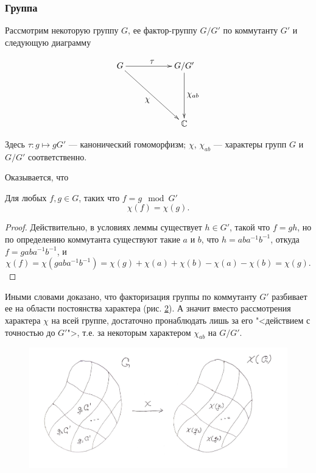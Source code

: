 \subsubsection{Группа}
    Рассмотрим некоторую группу $G$, ее фактор-группу $G/G'$ по коммутанту 
    $G'$ и следующую диаграмму

    \begin{figure}[h]
        \centering
        \[\xymatrix{
            G \ar[rr]^{\textstyle{\tau}} \ar[rrdd]_{\textstyle{\chi}} & & G/G'\ar[dd]^{\textstyle{\chi_{ab}}} \\
            & & \\
            & & \mathbb{C}
        }\]
        \caption{}
        \label{cd_ab}
    \end{figure}

    Здесь $\tau: g \mapsto gG'$ --- канонический гомоморфизм; $\chi$, 
    $\chi_{ab}$ --- характеры групп $G$ и $G/G'$ соответственно.

    Оказывается, что 

    \begin{lemma}\label{lm_const} Для любых $f, g \in G$, таких что $f = g \mod G'$ 
        \[\chi(f) = \chi(g).\]
    \end{lemma}

    \begin{proof} Действительно, в условиях леммы существует $h \in G'$, 
        такой что $f = gh$, но по определению коммутанта существуют такие 
        $a$ и $b$, что $h = aba^{-1}b^{-1}$, откуда $f = gaba^{-1}b^{-1}$, и 
        \[\chi(f) = \chi(gaba^{-1}b^{-1}) 
        = \chi(g) + \chi(a) + \chi(b) - \chi(a) - \chi(b) = \chi(g).\]
    \end{proof}

    Иными словами доказано, что факторизация 
    группы по коммутанту $G'$ разбивает ее на области постоянства
    характера (рис. \ref{img_chi_factor}). А значит вместо 
    рассмотрения характера $\chi$ на всей группе, достаточно пронаблюдать 
    лишь за его "<действием с точностью до $G'$">, т.е. за некоторым характером
    $\chi_{ab}$ на $G/G'$.

    \begin{figure}[h]
        \centering
        \includegraphics[width=\textwidth]{pictures/chips}
        \caption{}
        \label{img_chi_factor}
    \end{figure}

